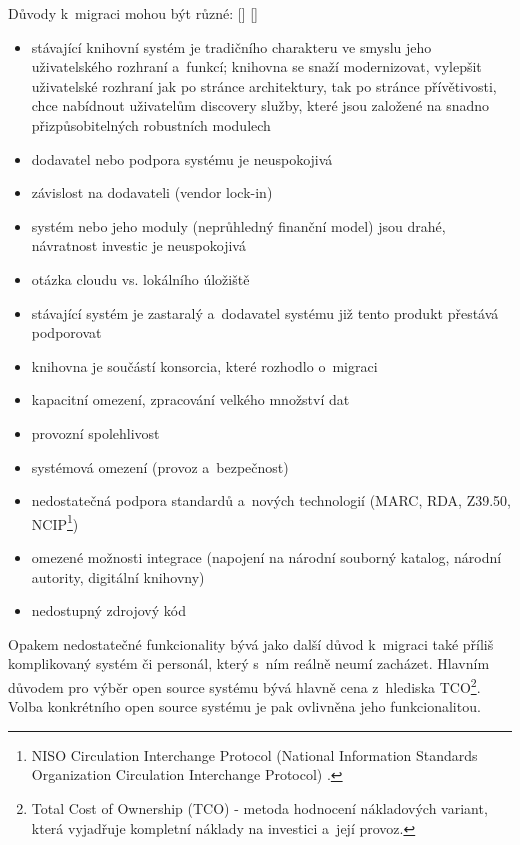 \documentclass[
	11pt, oneside, printed, final, palatino, monochrome
	microtype,
	table,   %
	lof,     %
	lot     %
]{fithesis3}
\newcommand{\citepages}[2]{[\cite[#1]{#2}]}
\newcommand{\mezera}{\bigskip}
\begin{document}
{Důvody k~migraci mohou být různé: \citepages{152}{bilal_2014} \citepages{6-10}{bartosek_2002}
\mezera
\begin{itemize}
\item stávající knihovní systém je tradičního charakteru ve smyslu jeho uživatelského rozhraní a~funkcí; knihovna se snaží modernizovat, vylepšit uživatelské rozhraní jak po stránce architektury, tak po stránce přívětivosti, chce nabídnout uživatelům discovery služby, které jsou založené na snadno přizpůsobitelných robustních modulech
\item dodavatel nebo podpora systému je neuspokojivá
\item závislost na dodavateli (vendor lock-in)
\item systém nebo jeho moduly (neprůhledný finanční model) jsou drahé, návratnost investic je neuspokojivá
\item otázka cloudu vs. lokálního úložiště
\item stávající systém je zastaralý a~dodavatel systému již tento produkt přestává podporovat
\item knihovna je součástí konsorcia, které rozhodlo o~migraci
\item kapacitní omezení, zpracování velkého množství dat
\item provozní spolehlivost
\item systémová omezení (provoz a~bezpečnost)
\item nedostatečná podpora standardů a~nových technologií (MARC, RDA, Z39.50, NCIP\footnote{NISO Circulation Interchange Protocol (National Information Standards Organization Circulation Interchange Protocol)
.})
\item omezené možnosti integrace (napojení na národní souborný katalog, národní autority, digitální knihovny)
\item nedostupný zdrojový kód
\end{itemize}

Opakem nedostatečné funkcionality bývá jako další důvod k~migraci také příliš komplikovaný systém či personál, který s~ním reálně neumí zacházet. Hlavním důvodem pro výběr open source systému bývá hlavně cena z~hlediska TCO\footnote{Total Cost of Ownership (TCO) - metoda hodnocení nákladových variant, která vyjadřuje kompletní náklady na investici a~její provoz.}. Volba konkrétního open source systému je pak ovlivněna jeho funkcionalitou.

}
\end{document}
